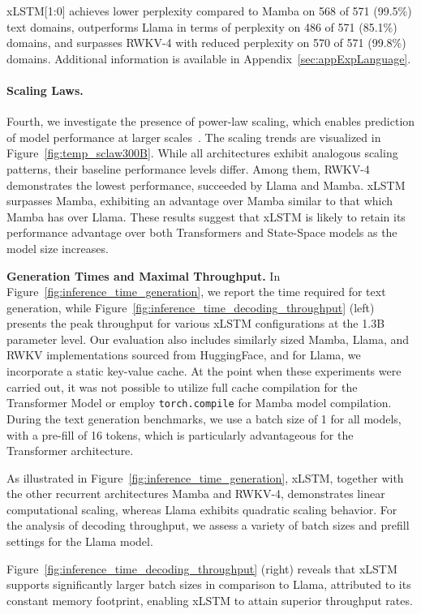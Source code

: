 xLSTM[1:0] achieves lower perplexity compared to Mamba on 568 of 571 (99.5\%) text domains, outperforms Llama in terms of perplexity on 486 of 571 (85.1\%) domains, and surpasses RWKV-4 with reduced perplexity on 570 of 571 (99.8\%) domains. Additional information is available in Appendix~\ref{sec:appExpLanguage}.

\paragraph{Scaling Laws.} Fourth, we investigate the presence of power-law scaling, which enables prediction of model performance at larger scales~\citep{Kaplan:20,Brown:20short}. The scaling trends are visualized in Figure~\ref{fig:temp_sclaw300B}. While all architectures exhibit analogous scaling patterns, their baseline performance levels differ. Among them, RWKV-4 demonstrates the lowest performance, succeeded by Llama and Mamba. xLSTM surpasses Mamba, exhibiting an advantage over Mamba similar to that which Mamba has over Llama. These results suggest that xLSTM is likely to retain its performance advantage over both Transformers and State-Space models as the model size increases.

\textbf{Generation Times and Maximal Throughput.} In Figure~\ref{fig:inference_time_generation}, we report the time required for text generation, while Figure~\ref{fig:inference_time_decoding_throughput} (left) presents the peak throughput for various xLSTM configurations at the 1.3B parameter level. Our evaluation also includes similarly sized Mamba, Llama, and RWKV implementations sourced from HuggingFace, and for Llama, we incorporate a static key-value cache. At the point when these experiments were carried out, it was not possible to utilize full cache compilation for the Transformer Model or employ \texttt{torch.compile} for Mamba model compilation. During the text generation benchmarks, we use a batch size of 1 for all models, with a pre-fill of 16 tokens, which is particularly advantageous for the Transformer architecture.

As illustrated in Figure~\ref{fig:inference_time_generation}, xLSTM, together with the other recurrent architectures Mamba and RWKV-4, demonstrates linear computational scaling, whereas Llama exhibits quadratic scaling behavior. For the analysis of decoding throughput, we assess a variety of batch sizes and prefill settings for the Llama model.

Figure~\ref{fig:inference_time_decoding_throughput} (right) reveals that xLSTM supports significantly larger batch sizes in comparison to Llama, attributed to its constant memory footprint, enabling xLSTM to attain superior throughput rates.

